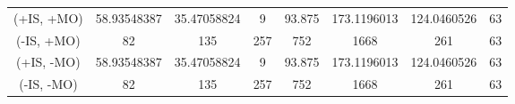 \begin{landscape}
\begin{table}[!t]
\begin{tabular}{|c|c|c|c|c|c|c|c|}
			\hline
			(+IS, +MO) & 58.93548387  & 35.47058824 & 9           & 93.875      & 173.1196013 & 124.0460526 & 63               \\
			(-IS, +MO) & 82           & 135         & 257         & 752         & 1668        & 261         & 63               \\
			(+IS, -MO) & 58.93548387  & 35.47058824 & 9           & 93.875      & 173.1196013 & 124.0460526 & 63               \\
			(-IS, -MO) & 82           & 135         & 257         & 752         & 1668        & 261         & 63               \\ 
			\hline

\end{tabular}
\end{table}
\end{landscape}
